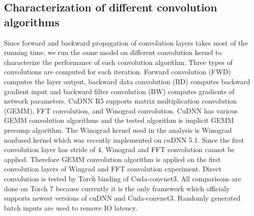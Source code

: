 

\subsection{Characterization of different convolution algorithms}
Since forward and backward propagation of convolution layers takes most of the running time, we run the same model on different convolution kernel to characterize the performance of each convolution algorithm.
Three types of convolutions are computed for each iteration.
Forward convolution (FWD) computes the layer output, backward data convolution (BD) computes backward gradient input and backward filter convolution (BW) computes gradients of network parameters.
CuDNN R5 supports matrix multiplication convolution (GEMM), FFT convolution, and Winograd convolution.
CuDNN has various GEMM convolution algorithms and the tested algorithm is implicit GEMM precomp algorithm.
The Winograd kernel used in the analysis is Winograd nonfused kernel which was recently implemented  on cuDNN 5.1.
Since the first convolution layer has stride of 4, Winograd and FFT convolution cannot be applied.
Therefore GEMM convolution algorithm is applied on the first convolution layers of Wingrad and FFT convolution experiment.
Direct convolution is tested by Torch binding of Cuda-convnet3.
All comparisons are done on Torch 7 because currently it is the only framework which officialy supports newest versions of cuDNN and Cuda-convnet3.
Randomly generated batch inputs are used to remove IO latency.

